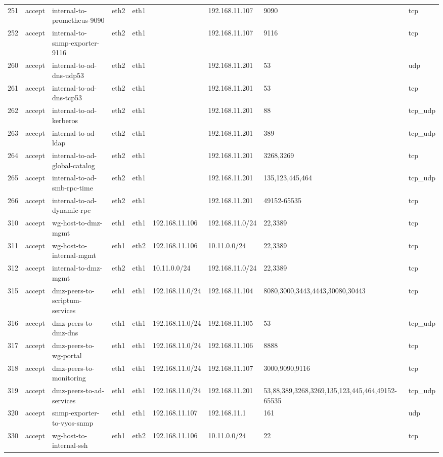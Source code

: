 \begin{longtable}{|l|l|l|l|l|l|l|p{2.2cm}|l|}
251 & accept & internal-to-prometheus-9090 & eth2 & eth1 &  & 192.168.11.107 & 9090 & tcp \\
252 & accept & internal-to-snmp-exporter-9116 & eth2 & eth1 &  & 192.168.11.107 & 9116 & tcp \\
260 & accept & internal-to-ad-dns-udp53 & eth2 & eth1 &  & 192.168.11.201 & 53 & udp \\
261 & accept & internal-to-ad-dns-tcp53 & eth2 & eth1 &  & 192.168.11.201 & 53 & tcp \\
262 & accept & internal-to-ad-kerberos & eth2 & eth1 &  & 192.168.11.201 & 88 & tcp_udp \\
263 & accept & internal-to-ad-ldap & eth2 & eth1 &  & 192.168.11.201 & 389 & tcp_udp \\
264 & accept & internal-to-ad-global-catalog & eth2 & eth1 &  & 192.168.11.201 & 3268,3269 & tcp \\
265 & accept & internal-to-ad-smb-rpc-time & eth2 & eth1 &  & 192.168.11.201 & 135,123,445,464 & tcp_udp \\
266 & accept & internal-to-ad-dynamic-rpc & eth2 & eth1 &  & 192.168.11.201 & 49152-65535 & tcp \\
310 & accept & wg-host-to-dmz-mgmt & eth1 & eth1 & 192.168.11.106 & 192.168.11.0/24 & 22,3389 & tcp \\
311 & accept & wg-host-to-internal-mgmt & eth1 & eth2 & 192.168.11.106 & 10.11.0.0/24 & 22,3389 & tcp \\
312 & accept & internal-to-dmz-mgmt & eth2 & eth1 & 10.11.0.0/24 & 192.168.11.0/24 & 22,3389 & tcp \\
315 & accept & dmz-peers-to-scriptum-services & eth1 & eth1 & 192.168.11.0/24 & 192.168.11.104 & 8080,3000,3443,4443,30080,30443 & tcp \\
316 & accept & dmz-peers-to-dmz-dns & eth1 & eth1 & 192.168.11.0/24 & 192.168.11.105 & 53 & tcp_udp \\
317 & accept & dmz-peers-to-wg-portal & eth1 & eth1 & 192.168.11.0/24 & 192.168.11.106 & 8888 & tcp \\
318 & accept & dmz-peers-to-monitoring & eth1 & eth1 & 192.168.11.0/24 & 192.168.11.107 & 3000,9090,9116 & tcp \\
319 & accept & dmz-peers-to-ad-services & eth1 & eth1 & 192.168.11.0/24 & 192.168.11.201 & 53,88,389,3268,3269,135,123,445,464,49152-65535 & tcp_udp \\
320 & accept & snmp-exporter-to-vyos-snmp & eth1 & eth1 & 192.168.11.107 & 192.168.11.1 & 161 & udp \\
330 & accept & wg-host-to-internal-ssh & eth1 & eth2 & 192.168.11.106 & 10.11.0.0/24 & 22 & tcp \\
\hline
\end{longtable}

